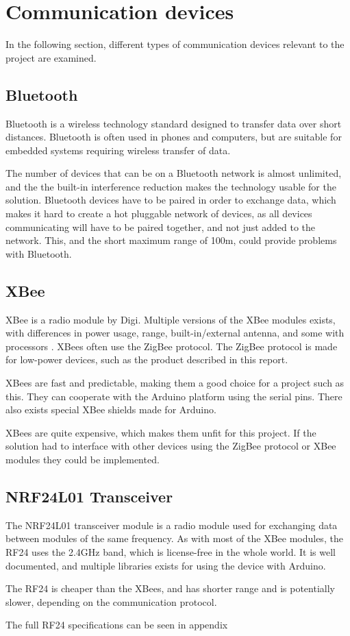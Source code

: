 \section{Communication devices}
In the following section, different types of communication devices relevant to the project are examined.

\subsection{Bluetooth}
Bluetooth is a wireless technology standard designed to transfer data over short distances\cite{bluetoothbasics}. Bluetooth is often used in phones and computers, but are suitable for embedded systems requiring wireless transfer of data.

The number of devices that can be on a Bluetooth network is almost unlimited, and the the built-in interference reduction makes the technology usable for the solution\cite{bluetoothbasics}.
Bluetooth devices have to be paired in order to exchange data, which makes it hard to create a hot pluggable network of devices, as all devices communicating will have to be paired together, and not just added to the network. 
This, and the short maximum range of 100m\cite{bluetoothbasics}, could provide problems with Bluetooth.

\subsection{XBee}
XBee is a radio module by Digi. Multiple versions of the XBee modules exists, with differences in power usage, range, built-in/external antenna, and some with processors \cite{sparkfunXbeeGuide}.
XBees often use the ZigBee protocol. The ZigBee protocol is made for low-power devices, such as the product described in this report\cite{zigbee}.

XBees are fast and predictable, making them a good choice for a project such as this. They can cooperate with the Arduino platform using the serial pins. There also exists special XBee shields made for Arduino.

XBees are quite expensive, which makes them unfit for this project. If the solution had to interface with other devices using the ZigBee protocol or XBee modules they could be implemented.

\subsection{NRF24L01 Transceiver}
The NRF24L01 transceiver module is a radio module used for exchanging data between modules of the same frequency. As with most of the XBee modules, the RF24 uses the 2.4GHz band, which is license-free in the whole world\cite{itubands}. It is well documented, and multiple libraries exists for using the device with Arduino.

The RF24 is cheaper than the XBees, and has shorter range and is potentially slower, depending on the communication protocol.

The full RF24 specifications can be seen in appendix 

